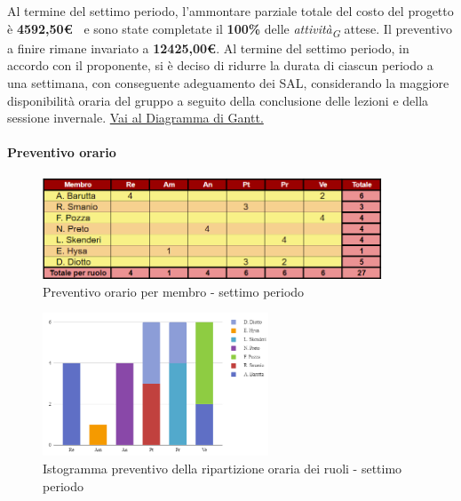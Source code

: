 Al termine del settimo periodo, l'ammontare parziale totale del costo del progetto è \textbf{ 4592,50\euro\ } e sono state completate il \textbf{100\%} delle \textit{attività}\textsubscript{\textit{G}} attese.
Il preventivo a finire rimane invariato a \textbf{12425,00€}.
Al termine del settimo periodo, in accordo con il proponente, si è deciso di ridurre la durata di ciascun periodo a una settimana, con conseguente adeguamento dei SAL, considerando la maggiore disponibilità oraria del gruppo a seguito della conclusione delle lezioni e della sessione invernale.
\href{https://github.com/orgs/ByteOps-swe/projects/3/views/1?sortedBy%5Bdirection%5D=asc&sortedBy%5BcolumnId%5D=64182560}{Vai al Diagramma di Gantt.}

\pagebreak

\paragraph{Preventivo orario}

\begin{figure}[H] 
    \centering
    \includegraphics[width=0.9\textwidth]{../Images/preventivoOrario7Periodo.png}
    \caption{Preventivo orario per membro - settimo periodo}
    \label{fig:Preventivo_orario_7}
\end{figure}

\vspace{0.6cm}

\begin{figure}[H]
    \centering
    \includegraphics[width=0.6\textwidth]{../Images/preventivoDivisioneRuoli7Periodo.png}
    \caption{Istogramma preventivo della ripartizione oraria dei ruoli - settimo periodo}
    \label{fig:Preventivo_ripartizione_oraria_7}
\end{figure}

